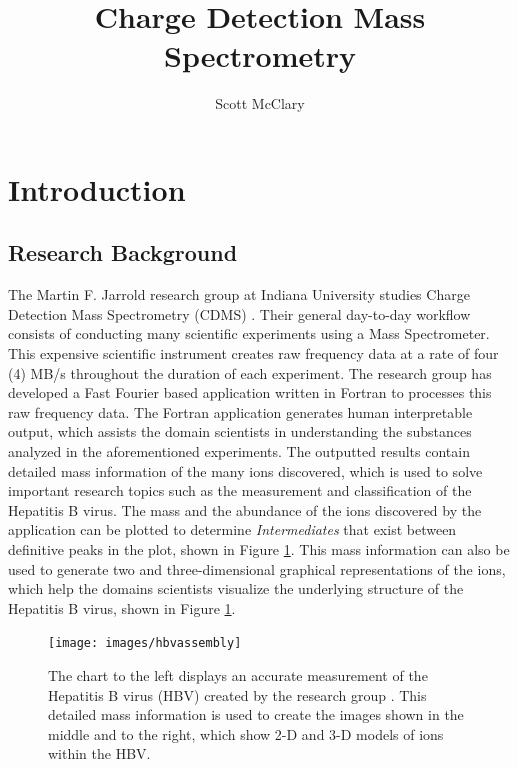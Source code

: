 \documentclass[9pt,twocolumn,twoside]{../../styles/osajnl}
\title{Charge Detection Mass Spectrometry}
\author[1,*]{Scott McClary}
\affil[1]{School of Informatics and Computing, Bloomington, IN 47408,
  U.S.A.}
\affil[*]{Corresponding authors: scmcclar@indiana.edu}
\begin{document}
\maketitle

\section{Introduction} \label{introduction}
\subsection{Research Background} \label{research-background}
The Martin F. Jarrold research group at Indiana University studies
Charge Detection Mass Spectrometry (CDMS) \cite{www-mfj}. Their
general day-to-day workflow consists of conducting many scientific
experiments using a Mass Spectrometer. This expensive scientific
instrument creates raw frequency data at a rate of four (4) MB/s
throughout the duration of each experiment. The research group has
developed a Fast Fourier based application written in Fortran to
processes this raw frequency data. The Fortran application generates
human interpretable output, which assists the domain scientists in
understanding the substances analyzed in the aforementioned
experiments. The outputted results contain detailed mass information
of the many ions discovered, which is used to solve important research
topics such as the measurement and classification of the Hepatitis B
virus. The mass and the abundance of the ions discovered by the
application can be plotted to determine \emph{Intermediates} that
exist between definitive peaks in the plot, shown in Figure
\ref{fig:hbvassembly}. This mass information can also be used to
generate two and three-dimensional graphical representations of the
ions, which help the domains scientists visualize the underlying
structure of the Hepatitis B virus, shown in Figure
\ref{fig:hbvassembly}.

\begin{figure}[h]
\centering
\texttt{[image: images/hbvassembly]}
\caption{The chart to the left displays an accurate measurement of the
  Hepatitis B virus (HBV) created by the research group
  \cite{chem14cdms}. This detailed mass information is used to create
  the images shown in the middle and to the right, which show 2-D and
  3-D models of ions within the HBV. \cite{chem14cdms}}
\label{fig:hbvassembly}
\end{figure}
\end{document}
